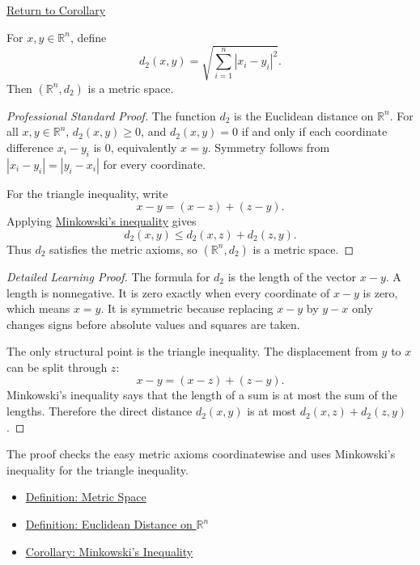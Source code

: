 \newpage
{}
\label{prf:euclidean-metric}

\begin{remark*}[Return]
\hyperref[cor:euclidean-metric]{Return to Corollary}
\end{remark*}

\begin{corollary*}
For \(x,y\in\mathbb{R}^n\), define
\[
  d_2(x,y)=\sqrt{\sum_{i=1}^{n}|x_i-y_i|^2}.
\]
Then \((\mathbb{R}^n,d_2)\) is a metric space.
\end{corollary*}

\begin{proof}[Professional Standard Proof]
\LRAProofBodyStart
The function \(d_2\) is the Euclidean distance on \(\mathbb{R}^n\).  For all
\(x,y\in\mathbb{R}^n\), \(d_2(x,y)\geq 0\), and \(d_2(x,y)=0\) if and only if
each coordinate difference \(x_i-y_i\) is \(0\), equivalently \(x=y\).
Symmetry follows from \(|x_i-y_i|=|y_i-x_i|\) for every coordinate.

For the triangle inequality, write
\[
  x-y=(x-z)+(z-y).
\]
Applying \hyperref[cor:minkowski-inequality-rn]{Minkowski's inequality} gives
\[
  d_2(x,y)\leq d_2(x,z)+d_2(z,y).
\]
Thus \(d_2\) satisfies the metric axioms, so \((\mathbb{R}^n,d_2)\) is a
metric space.
\end{proof}

\begin{proof}[Detailed Learning Proof]
\LRAProofBodyStart
The formula for \(d_2\) is the length of the vector \(x-y\).  A length is
nonnegative.  It is zero exactly when every coordinate of \(x-y\) is zero,
which means \(x=y\).  It is symmetric because replacing \(x-y\) by \(y-x\)
only changes signs before absolute values and squares are taken.

The only structural point is the triangle inequality.  The displacement from
\(y\) to \(x\) can be split through \(z\):
\[
  x-y=(x-z)+(z-y).
\]
Minkowski's inequality says that the length of a sum is at most the sum of
the lengths.  Therefore the direct distance \(d_2(x,y)\) is at most
\(d_2(x,z)+d_2(z,y)\).
\end{proof}

\begin{remark*}
The proof checks the easy metric axioms coordinatewise and uses Minkowski's
inequality for the triangle inequality.
\end{remark*}

\begin{dependencies}
\begin{itemize}
  \item \hyperref[def:metric-space]{Definition: Metric Space}
  \item \hyperref[def:euclidean-distance-rn]{Definition: Euclidean Distance on \(\mathbb{R}^n\)}
  \item \hyperref[cor:minkowski-inequality-rn]{Corollary: Minkowski's Inequality}
\end{itemize}
\end{dependencies}

\clearpage
